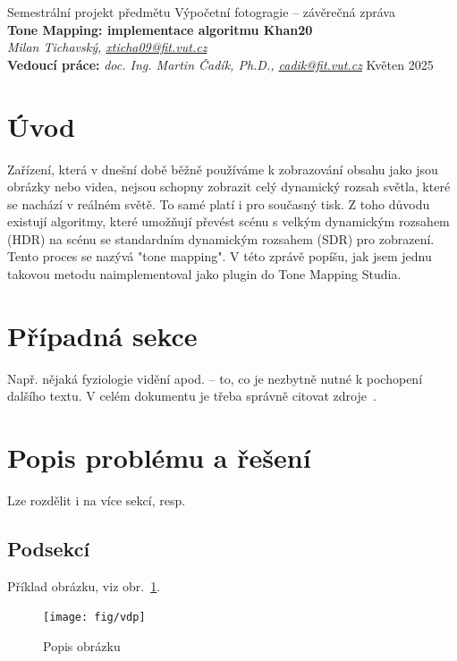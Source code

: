 \documentclass[11pt,a4paper,oneside]{article}
\begin{document}
\thispagestyle{empty}
\begin{center}
\vspace*{60mm}
{Semestrální projekt předmětu Výpočetní fotogragie -- závěrečná zpráva }\\
\smallskip
{\Large\bf Tone Mapping: implementace algoritmu Khan20}\\
\smallskip
{\it Milan Tichavský, \url{xticha09@fit.vut.cz}}\\
\vfill
{\bf Vedoucí práce:} {\it doc. Ing. Martin Čadík, Ph.D., \url{cadik@fit.vut.cz}} 
\hfill {Květen 2025}


\end{center}
\newpage


\section{Úvod}

Zařízení, která v dnešní době běžně používáme k zobrazování obsahu jako jsou
obrázky nebo videa, nejsou schopny zobrazit celý dynamický rozsah světla, které
se nachází v reálném světě. To samé platí i pro současný tisk. Z toho důvodu
existují algoritmy, které umožňují převést scénu s velkým dynamickým rozsahem
(HDR) na scénu se standardním dynamickým rozsahem (SDR) pro zobrazení. Tento
proces se nazývá "tone mapping". V této zprávě popíšu, jak jsem jednu takovou
metodu naimplementoval jako plugin do Tone Mapping Studia.


\section{Případná sekce}
Např. nějaká fyziologie vidění apod. -- to, co je nezbytně nutné k pochopení
dalšího textu. V celém dokumentu je třeba správně citovat 
zdroje~\cite{Daly:1993:VDP:197765.197783}.


\section{Popis problému a řešení}
Lze rozdělit i na více sekcí, resp. 

\subsection{Podsekcí}
Příklad obrázku, viz obr.~\ref{fig:vdp}.


\begin{figure}[htb]
  \begin{center}
    \texttt{[image: fig/vdp]}
    \caption{Popis obrázku} 
    \label{fig:vdp}
  \end{center}
\end{figure}
\end{document}
